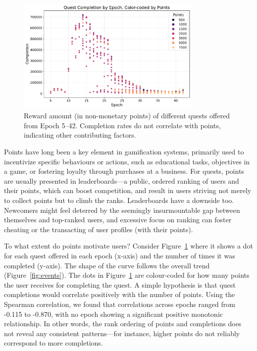 \begin{figure}[t]
    \centering
    \includegraphics[width=0.8\textwidth]{figures/points.pdf}
    \caption{Reward amount (in non-monetary points) of different quests offered from Epoch 5--42. Completion rates do not correlate with points, indicating other contributing factors.\label{fig:points}}
\end{figure}

Points have long been a key element in gamification systems, primarily used to incentivize specific behaviours or actions, such as educational tasks, objectives in a game, or fostering loyalty through purchases at a business. For quests, points are usually presented in leaderboards---a public, ordered ranking of users and their points, which can boost competition, and result in users striving not merely to collect points but to climb the ranks. Leaderboards have a downside too. Newcomers might feel deterred by the seemingly insurmountable gap between themselves and top-ranked users, and excessive focus on ranking can foster cheating or the transacting of user profiles (with their points).

To what extent do points motivate users? Consider Figure~\ref{fig:points} where it shows a dot for each quest offered in each epoch (x-axis) and the number of times it was completed (y-axis). The shape of the curve follows the overall trend (Figure~\ref{fig:events}). The dots in Figure~\ref{fig:points} are colour-coded for how many points the user receives for completing the quest. A simple hypothesis is that quest completions would correlate positively with the number of points. Using the Spearman correlation, we found that correlations across epochs ranged from -0.115 to -0.870, with no epoch showing a significant positive monotonic relationship. In other words, the rank ordering of points and completions does not reveal any consistent patterns—for instance, higher points do not reliably correspond to more completions.

